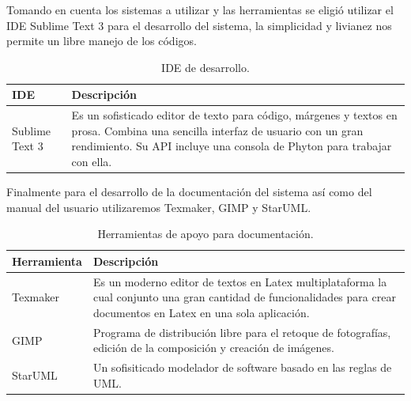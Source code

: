 \documentclass[12pt]{report}
\begin{document}
Tomando en cuenta los sistemas a utilizar y las herramientas se eligió utilizar el IDE Sublime Text 3 para el desarrollo del sistema, la simplicidad y livianez nos permite un libre manejo de los códigos.
\begin{table}[H]
\begin{center}
\begin{tabular}{|p{40mm}|p{100mm}|}
\hline
IDE & Descripción\\
\hline \hline 
Sublime Text 3 & Es un sofisticado editor de texto para código, márgenes y textos en prosa. Combina una sencilla interfaz de usuario con un gran rendimiento. Su API incluye una consola de Phyton para trabajar con ella.\cite{subli}\\
\hline
\end{tabular}
\caption{IDE de desarrollo.}
\end{center}
\end{table}

Finalmente para el desarrollo de la documentación del sistema así como del manual del usuario utilizaremos Texmaker, GIMP y StarUML.
\begin{table}[H]
\begin{center}
\begin{tabular}{|p{40mm}|p{100mm}|}
\hline
 Herramienta & Descripción\\
\hline \hline 
Texmaker & Es un moderno editor de textos en Latex multiplataforma la cual conjunto una gran cantidad de funcionalidades para crear documentos en Latex en una sola aplicación.\cite{texm}\\
\hline
GIMP &  Programa de distribución libre para el retoque de fotografías, edición de la composición y creación de imágenes.\cite{gimp}\\
\hline
StarUML & Un sofisiticado modelador de software basado en las reglas de UML.\cite{star} \\
\hline
\end{tabular}
\caption{Herramientas de apoyo para documentación.}
\end{center}
\end{table}
\end{document}
